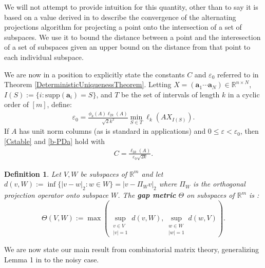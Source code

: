 \documentclass[journal, onecolumn]{IEEEtran}
\newtheorem{definition}{Definition}
\begin{document}
We will not attempt to provide intuition for this quantity, other than to say it is based on a value derived in \cite{Deutsch} to describe the convergence of the alternating projections algorithm for projecting a point onto the intersection of a set of subspaces. We use it to bound the distance between a point and the interesection of a set of subspaces given an upper bound on the distance from that point to each individual subspace. 


We are now in a position to explicitly state the constants $C$ and $\varepsilon_0$ referred to in Theorem \ref{DeterministicUniquenessTheorem}. Letting $X  = (\mathbf{a}_1 \cdots \mathbf{a}_N) \in \mathbb{R}^{n \times N}$, $I(S) := \{i : \text{supp}(\mathbf{a}_i) = S\}$, and $T$ be the set of intervals of length $k$ in a cyclic order of $[m]$, define:
\begin{align}\label{epsilon0}
\varepsilon_0 = \frac{ \phi_k(A) \ell_{2k}(A) }{\sqrt{2}k^2} \min_{S \in T} \ell_k(AX_{I(S)}).
\end{align}
If $A$ has unit norm columns (as is standard in applications) and $0 \leq \varepsilon < \varepsilon_0$, then \eqref{Cstable} and \eqref{b-PDa} hold with
\begin{align}\label{Cdef}
C = \frac{\ell_{2k}(A)}{ \varepsilon_0 \sqrt{2k}}.
\end{align}

\begin{definition}
Let $V, W$ be subspaces of $\mathbb{R}^m$ and let $d(v,W) := \inf\{|v-w|_2: w \in W\} = |v - \Pi_W v|_2$ where $\Pi_W$ is the orthogonal projection operator onto subspace $W$. The \textbf{gap metric} $\Theta$ on subspaces of $\mathbb{R}^{m}$ is \cite{TheoryOfLinearOperatorsPage69}:
\begin{equation}\label{SubspaceMetric}
\Theta(V,W) := \max\left( \sup_{\substack{v \in V \\ |v| = 1}} d(v,W), \sup_{\substack{w \in W \\ |w| = 1}} d(w,V) \right).
\end{equation}
\end{definition}

We are now state our main result from combinatorial matrix theory, generalizing Lemma 1 in \cite{Hillar15} to the noisy case.

\end{document}

